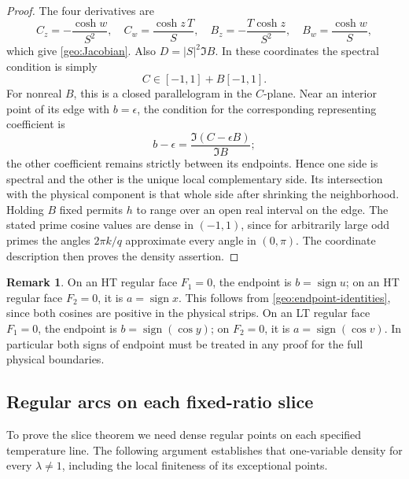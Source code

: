 \documentclass[11pt]{article}
\numberwithin{equation}{section}
\theoremstyle{definition}
\newtheorem{remark}[theorem]{Remark}
\begin{document}
\begin{proof}
The four derivatives are
\[
 C_z=-\frac{\cosh w}{S^2},\quad
 C_w=\frac{\cosh z\,T}{S},\quad
 B_z=-\frac{T\cosh z}{S^2},\quad
 B_w=\frac{\cosh w}{S},
\]
which give \eqref{geo:Jacobian}.
Also \(D=|S|^2\Im B\).  In these coordinates the spectral
condition is simply
\[
                         C\in[-1,1]+B[-1,1].
\]
For nonreal \(B\), this is a closed parallelogram in the
\(C\)-plane.  Near an interior point of its edge with
\(b=\epsilon\), the condition for the corresponding
representing coefficient is
\[
          b-\epsilon=\frac{\Im(C-\epsilon B)}{\Im B};
\]
the other coefficient remains strictly between its
endpoints.  Hence one side is spectral and the other
is the unique local complementary side.  Its intersection
with the physical component is that whole side after
shrinking the neighborhood.
Holding \(B\) fixed permits \(h\) to range over an open
real interval on the edge.  The stated prime cosine
values are dense in \((-1,1)\), since for arbitrarily
large odd primes the angles \(2\pi k/q\) approximate
every angle in \((0,\pi)\).  The coordinate description
then proves the density assertion.
\end{proof}

\begin{remark}\label{geo:endpoint-signs}
On an HT regular face \(F_1=0\), the endpoint is
\(b=\operatorname{sign}u\); on an HT regular face \(F_2=0\),
it is \(a=\operatorname{sign}x\).
This follows from \eqref{geo:endpoint-identities}, since
both cosines are positive in the physical strips.
On an LT regular face \(F_1=0\), the endpoint is
\(b=\operatorname{sign}(\cos y)\); on \(F_2=0\), it is
\(a=\operatorname{sign}(\cos v)\).
In particular both signs of endpoint must be treated in
any proof for the full physical boundaries.
\end{remark}

\subsection{Regular arcs on each fixed-ratio slice}
\label{geo:slice-regularity-section}

To prove the slice theorem we need dense regular points on each
specified temperature line. The following argument establishes that
one-variable density for every \(\lambda\ne1\), including the
local finiteness of its exceptional points.
\end{document}
